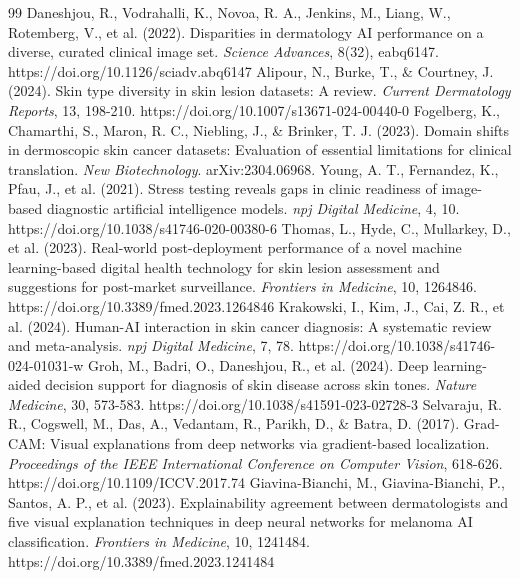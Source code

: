 \documentclass[11pt,a4paper]{article}
\begin{document}
\begin{thebibliography}{99}
 Daneshjou, R., Vodrahalli, K., Novoa, R. A., Jenkins, M., Liang, W., Rotemberg, V., et al. (2022). Disparities in dermatology AI performance on a diverse, curated clinical image set. \textit{Science Advances}, 8(32), eabq6147. https://doi.org/10.1126/sciadv.abq6147
 Alipour, N., Burke, T., \& Courtney, J. (2024). Skin type diversity in skin lesion datasets: A review. \textit{Current Dermatology Reports}, 13, 198-210. https://doi.org/10.1007/s13671-024-00440-0
 Fogelberg, K., Chamarthi, S., Maron, R. C., Niebling, J., \& Brinker, T. J. (2023). Domain shifts in dermoscopic skin cancer datasets: Evaluation of essential limitations for clinical translation. \textit{New Biotechnology}. arXiv:2304.06968.
 Young, A. T., Fernandez, K., Pfau, J., et al. (2021). Stress testing reveals gaps in clinic readiness of image-based diagnostic artificial intelligence models. \textit{npj Digital Medicine}, 4, 10. https://doi.org/10.1038/s41746-020-00380-6
 Thomas, L., Hyde, C., Mullarkey, D., et al. (2023). Real-world post-deployment performance of a novel machine learning-based digital health technology for skin lesion assessment and suggestions for post-market surveillance. \textit{Frontiers in Medicine}, 10, 1264846. https://doi.org/10.3389/fmed.2023.1264846
 Krakowski, I., Kim, J., Cai, Z. R., et al. (2024). Human-AI interaction in skin cancer diagnosis: A systematic review and meta-analysis. \textit{npj Digital Medicine}, 7, 78. https://doi.org/10.1038/s41746-024-01031-w
 Groh, M., Badri, O., Daneshjou, R., et al. (2024). Deep learning-aided decision support for diagnosis of skin disease across skin tones. \textit{Nature Medicine}, 30, 573-583. https://doi.org/10.1038/s41591-023-02728-3
 Selvaraju, R. R., Cogswell, M., Das, A., Vedantam, R., Parikh, D., \& Batra, D. (2017). Grad-CAM: Visual explanations from deep networks via gradient-based localization. \textit{Proceedings of the IEEE International Conference on Computer Vision}, 618-626. https://doi.org/10.1109/ICCV.2017.74
 Giavina-Bianchi, M., Giavina-Bianchi, P., Santos, A. P., et al. (2023). Explainability agreement between dermatologists and five visual explanation techniques in deep neural networks for melanoma AI classification. \textit{Frontiers in Medicine}, 10, 1241484. https://doi.org/10.3389/fmed.2023.1241484

\end{thebibliography}
\end{document}
